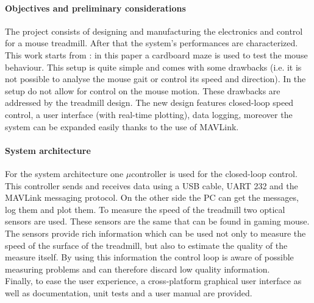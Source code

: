 \documentclass[12pt,a4paper, twoside]{article}
\begin{document}
\begin{multicols}{2}
[]

\paragraph{Objectives and preliminary considerations} 
\indent
\lfoot{\today}
The project consists of designing and manufacturing the electronics and control for a mouse treadmill. After that the system's performances are characterized. This work starts from \cite{Ole}: in this paper a cardboard maze is used to test the mouse behaviour. This setup is quite simple and comes with some drawbacks (i.e. it is not possible to analyse the mouse gait or control its speed and direction). In \cite{Neuron} the setup do not allow for control on the mouse motion. These drawbacks are addressed by the treadmill design. The new design features closed-loop speed control, a user interface (with real-time plotting), data logging, moreover the system can be expanded easily thanks to the use of MAVLink.
\paragraph{System architecture}
 For the system architecture one $\mu$controller is used for the closed-loop control. This controller sends and receives data using a USB cable, UART 232 and the MAVLink messaging protocol. On the other side the PC can get the messages, log them and plot them. To measure the speed of the treadmill two optical sensors are used. These sensors are the same that can be found in gaming mouse. The sensors provide rich information which can be used not only to measure the speed of the surface of the treadmill, but also to estimate the quality of the measure itself. By using this information the control loop is aware of possible measuring problems and can therefore discard low quality information.\\
 Finally, to ease the user experience, a cross-platform graphical user interface as well as documentation, unit tests and a user manual are provided. 


\end{multicols}
\end{document}
